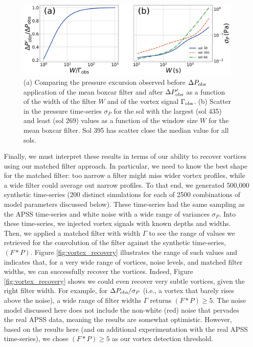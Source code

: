 \documentclass[linenumbers,trackchanges]{aastex63}
\begin{document}
\begin{figure}
    \centering
    \includegraphics[width=\textwidth]{figures/Pobsprime-sigmaP_vs_W.png}
    \caption{(a) Comparing the pressure excursion observed before $\Delta P_{\rm obs}$ application of the mean boxcar filter and after $\Delta P_{\rm obs}^\prime$ as a function of the width of the filter $W$ and of the vortex signal $\Gamma_{\rm obs}$. (b) Scatter in the pressure time-series $\sigma_P$ for the sol with the largest (sol 435) and least (sol 269) values as a function of the window size $W$ for the mean boxcar filter. Sol 395 has scatter close the median value for all sols. }
    \label{fig:Pobsprime-sigmaP_vs_W}
\end{figure}

Finally, we must interpret these results in terms of our ability to recover vortices using our matched filter approach. In particular, we need to know the best shape for the matched filter: too narrow a filter might miss wider vortex profiles, while a wide filter could average out narrow profiles. To that end, we generated 500,000 synthetic time-series (200 distinct simulations for each of 2500 combinations of model parameters discussed below). These time-series had the same sampling as the APSS time-series and white noise with a wide range of variances $\sigma_P$. Into these time-series, we injected vortex signals with known depths and widths. Then, we applied a matched filter with width $\Gamma$ to see the range of values we retrieved for the convolution of the filter against the synthetic time-series, $\left( F \ast P \right)$. Figure \ref{fig:vortex_recovery} illustrates the range of such values and indicates that, for a very wide range of vortices, noise levels, and matched filter widths, we can successfully recover the vortices. Indeed, Figure \ref{fig:vortex_recovery} shows we could even recover very subtle vortices, given the right filter width. For example, for $\Delta P_{\rm obs}/\sigma_P$ (i.e., a vortex that barely rises above the noise), a wide range of filter widths $\Gamma$ returns $\left( F \ast P \right) \geq 5 $. The noise model discussed here does not include the non-white (red) noise that pervades the real APSS data, meaning the results are somewhat optimistic. However, based on the results here (and on additional experimentation with the real APSS time-series), we chose $\left( F \ast P \right) \geq 5 $ as our vortex detection threshold. 
\end{document}
